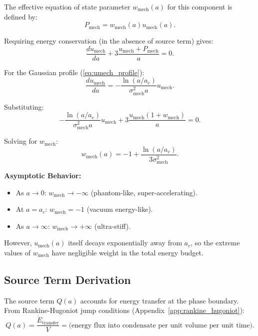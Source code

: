 \documentclass[11pt,a4paper]{article}
\newcommand{\umech}{\ensuremath{u_{\mathrm{mech}}}}
\newcommand{\wmech}{\ensuremath{w_{\mathrm{mech}}}}
\theoremstyle{definition}
\theoremstyle{remark}
\begin{document}
The effective equation of state parameter $\wmech(a)$ for this component is defined by:
\begin{equation}
P_{\mathrm{mech}} = \wmech(a)\umech(a).
\end{equation}

Requiring energy conservation (in the absence of source term) gives:
\begin{equation}
\frac{d\umech}{da} + 3\frac{\umech + P_{\mathrm{mech}}}{a} = 0.
\end{equation}

For the Gaussian profile (\ref{eq:umech_profile}):
\begin{equation}
\frac{d\umech}{da} = -\frac{\ln(a/a_c)}{\sigma_{\mathrm{mech}}^2 a}\umech.
\end{equation}

Substituting:
\begin{equation}
-\frac{\ln(a/a_c)}{\sigma_{\mathrm{mech}}^2 a}\umech + 3\frac{\umech(1 + \wmech)}{a} = 0.
\end{equation}

Solving for $\wmech$:
\begin{equation}
\label{eq:wmech_solution}
\boxed{\wmech(a) = -1 + \frac{\ln(a/a_c)}{3\sigma_{\mathrm{mech}}^2}.}
\end{equation}

\textbf{Asymptotic Behavior:}
\begin{itemize}[leftmargin=*, itemsep=0.2em]
\item As $a \to 0$: $\wmech \to -\infty$ (phantom-like, super-accelerating).
\item At $a = a_c$: $\wmech = -1$ (vacuum energy-like).
\item As $a \to \infty$: $\wmech \to +\infty$ (ultra-stiff).
\end{itemize}

However, $\umech(a)$ itself decays exponentially away from $a_c$, so the extreme values of $\wmech$ have negligible weight in the total energy budget.

\subsection{Source Term Derivation}
\label{sec:source_term}

The source term $Q(a)$ accounts for energy transfer at the phase boundary. From Rankine-Hugoniot jump conditions (Appendix~\ref{app:rankine_hugoniot}):
\begin{equation}
Q(a) = \frac{\dot{E}_{\mathrm{transfer}}}{V} = \text{(energy flux into condensate per unit volume per unit time)}.
\end{equation}
\end{document}
